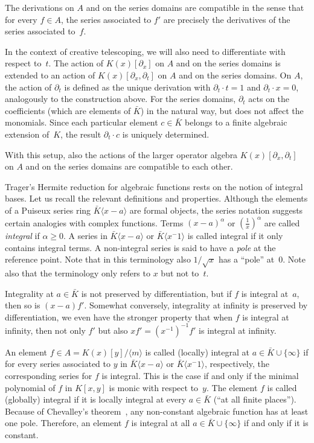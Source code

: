 \documentclass{sig-alternate}
\def\<#1>{\langle#1\rangle}
\begin{document}
The derivations on $A$ and on the series domains are compatible in the sense
that for every $f\in A$, the series associated to $f'$ are precisely the
derivatives of the series associated to~$f$.

In the context of creative telescoping, we will also need to differentiate with
respect to~$t$. The action of $K(x)[\partial_x]$ on $A$ and on the series domains
is extended to an action of $K(x)[\partial_x,\partial_t]$ on $A$ and on the series
domains. On $A$, the action of $\partial_t$ is defined as the unique derivation with
$\partial_t\cdot t=1$ and $\partial_t\cdot x=0$, analogously to the construction
above. For the series domains, $\partial_t$ acts on the coefficients 
(which are elements of $\bar K$) in the natural way, but does not affect the monomials.
Since each particular element $c\in\bar K$ belongs to a finite algebraic extension of~$K$, 
the result $\partial_t\cdot c$ is uniquely determined. 

With this setup, also the actions of the larger operator algebra
$K(x)[\partial_x,\partial_t]$ on $A$ and on the series domains are compatible to
each other.

\medskip

Trager's Hermite reduction for algebraic functions rests on the notion of
integral bases. Let us recall the relevant definitions and properties. 
Although the elements of a Puiseux series ring $\bar K\<x-a>$ are formal
objects, the series notation suggests certain analogies with complex
functions. Terms $(x-a)^\alpha$ or $(\tfrac1x)^\alpha$ are
called \emph{integral} if $\alpha\geq0$. A series in
$\bar K\<x-a>$ or $\bar K\<x^{-1}>$ is called integral if it only contains integral
terms. A non-integral series is said to have a \emph{pole} at the reference
point. Note that in this terminology also $1/\sqrt{x}$ has a ``pole''
at~$0$. Note also that the terminology only refers to $x$ but not to~$t$. 

Integrality at $a\in\bar K$ is not preserved by differentiation,
but if $f$ is integral at~$a$, then so is $(x-a)f'$. Somewhat conversely,
integrality at infinity is preserved by differentiation, we even have the
stronger property that when $f$ is integral at infinity, then not only $f'$ but also $xf'=(x^{-1})^{-1}f'$ is
integral at infinity.

An element $f\in A=K(x)[y]/\<m>$
is called (locally) integral at $a\in\bar K\cup\{\infty\}$ if for every series
associated to $y$ in $\bar K\<x-a>$ or $\bar K \<x^{-1}>$, respectively, 
the corresponding series for $f$ is integral. 
This is the case if and only if the minimal polynomial of $f$ in $K[x,y]$ is monic
with respect to~$y$.
The element $f$ is called (globally) integral if it is locally integral at every
$a\in\bar K$ (``at all finite places'').
Because of Chevalley's theorem~\cite[page 9, Corollary 3]{Chevalley1951}, any 
non-constant algebraic function has at least one pole. Therefore, an element $f$ is 
integral at all $a\in\bar K\cup\{\infty\}$ if and only if it is constant. 
\end{document}
